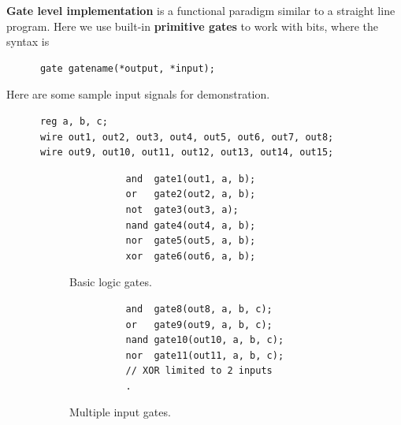   \begin{definition}
    \textbf{Gate level implementation} is a functional paradigm similar to a straight line program. Here we use built-in \textbf{primitive gates} to work with bits, where the syntax is 
    \begin{lstlisting}
      gate gatename(*output, *input);
    \end{lstlisting}

    Here are some sample input signals for demonstration.
    \begin{lstlisting}
      reg a, b, c;
      wire out1, out2, out3, out4, out5, out6, out7, out8;
      wire out9, out10, out11, out12, out13, out14, out15; 
    \end{lstlisting}

    \begin{figure}[H]
      \centering
      \begin{subfigure}[b]{0.48\textwidth}
        \centering
        \begin{lstlisting}
          and  gate1(out1, a, b);
          or   gate2(out2, a, b);
          not  gate3(out3, a);   
          nand gate4(out4, a, b);
          nor  gate5(out5, a, b);
          xor  gate6(out6, a, b);
        \end{lstlisting}
        \caption{Basic logic gates.}
      \end{subfigure}
      \hfill 
      \begin{subfigure}[b]{0.48\textwidth}
        \centering
        \begin{lstlisting}
          and  gate8(out8, a, b, c);   
          or   gate9(out9, a, b, c);   
          nand gate10(out10, a, b, c); 
          nor  gate11(out11, a, b, c); 
          // XOR limited to 2 inputs
          .
        \end{lstlisting}
        \caption{Multiple input gates.}
      \end{subfigure}
      \caption{}
    \end{figure}
  \end{definition}

